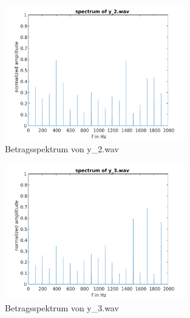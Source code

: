 \begin{enumerate}[a)]
\begin{figure}[H]
    \center
    \includegraphics[width = 0.7\textwidth]{Figures/spectrum2.pdf}
    \caption{Betragsspektrum von y\_2.wav}
    \label{fig:bs2}
\end{figure}

\begin{figure}[H]
    \center
    \includegraphics[width = 0.7\textwidth]{Figures/spectrum3.pdf}
    \caption{Betragsspektrum von y\_3.wav}
    \label{fig:bs3}
\end{figure}

\end{enumerate}